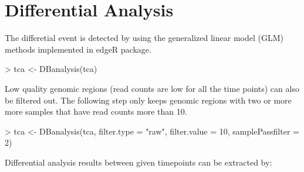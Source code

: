 \documentclass[a4paper]{article}
\begin{document}
\section{Differential Analysis}
The differetial event is detected by using the generalized linear model (GLM) methods \cite{McCarthy} implemented in edgeR package.
\begin{Schunk}
\begin{Sinput}
> tca <- DBanalysis(tca)
\end{Sinput}
\end{Schunk}
Low quality genomic regions (read counts are low for all the time points) can also be filtered out. The following step only keeps genomic regions with two or more more samples that have read counts more than 10.
\begin{Schunk}
\begin{Sinput}
> tca <- DBanalysis(tca, filter.type = "raw", filter.value = 10, samplePassfilter = 2)
\end{Sinput}
\end{Schunk}
Differential analysis results between given timepoints can be extracted by:
\end{document}
